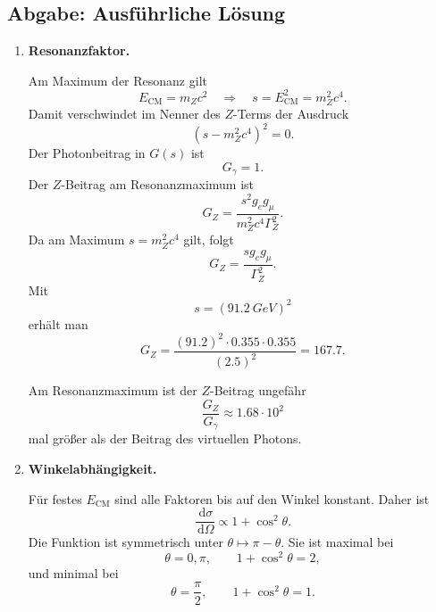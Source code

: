 \documentclass[11pt,a4paper]{scrartcl}
\newcommand{\paren}[1]{\left( #1 \right)}
\newcommand{\dd}{\,\mathrm{d}}
\newcommand{\diffxs}{\frac{\dd\sigma}{\dd\Omega}}
\theoremstyle{definition}
\theoremstyle{plain}
\theoremstyle{remark}
\begin{document}
\subsection{Abgabe: Ausführliche Lösung}

\begin{enumerate}[label=(\alph*)]
    \item \textbf{Resonanzfaktor.}

    \begin{calculationbox}
        Am Maximum der Resonanz gilt
        \[
            E_{\mathrm{CM}}=m_Zc^2
            \quad\Longrightarrow\quad
            s=E_{\mathrm{CM}}^2=m_Z^2c^4.
        \]
        Damit verschwindet im Nenner des $Z$-Terms der Ausdruck
        \[
            \paren{s-m_Z^2c^4}^2=0.
        \]
        Der Photonbeitrag in $G(s)$ ist
        \[
            G_\gamma=1.
        \]
        Der $Z$-Beitrag am Resonanzmaximum ist
        \[
            G_Z
            =\frac{s^2g_eg_\mu}{m_Z^2c^4\Gamma_Z^2}.
        \]
        Da am Maximum $s=m_Z^2c^4$ gilt, folgt
        \[
            G_Z=\frac{s g_eg_\mu}{\Gamma_Z^2}.
        \]
        Mit
        \[
            s=(\SI{91.2}{GeV})^2
        \]
        erhält man
        \[
            G_Z=\frac{(91.2)^2\cdot0.355\cdot0.355}{(2.5)^2}=167.7.
        \]
    \end{calculationbox}

    \begin{answerbox}
        Am Resonanzmaximum ist der $Z$-Beitrag ungefähr
        \[
            \boxed{\frac{G_Z}{G_\gamma}\approx 1.68\cdot10^2}
        \]
        mal größer als der Beitrag des virtuellen Photons.
    \end{answerbox}

    \item \textbf{Winkelabhängigkeit.}

    \begin{calculationbox}
        Für festes $E_{\mathrm{CM}}$ sind alle Faktoren bis auf den Winkel konstant. Daher ist
        \[
            \diffxs\propto 1+\cos^2\theta.
        \]
        Die Funktion ist symmetrisch unter $\theta\mapsto \pi-\theta$. Sie ist maximal bei
        \[
            \theta=0,\pi,
            \qquad
            1+\cos^2\theta=2,
        \]
        und minimal bei
        \[
            \theta=\frac{\pi}{2},
            \qquad
            1+\cos^2\theta=1.
        \]
    \end{calculationbox}


\end{enumerate}
\end{document}
